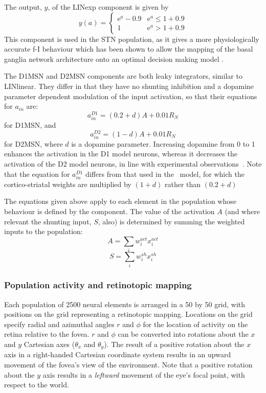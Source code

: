 \documentclass{frontiersSCNS}
\begin{document}
The output, $y$, of the LINexp component is given by
\[
   y(a) = \begin{cases}
      \mathrm{e}^{a}-0.9   & \mathrm{e}^a \leq 1+0.9 \\
      1   & \mathrm{e}^a > 1+0.9
   \end{cases}
\]
This component is used in the STN population, as it gives a more
physiologically accurate f-I
behaviour 
which has been shown to allow the mapping of the basal ganglia network
architecture onto an optimal decision making
model .

The D1MSN and D2MSN components are both leaky integrators, similar to
LINlinear. They differ in that they have no shunting inhibition and a
dopamine parameter dependent modulation of the input activation, so
that their equations for $a_{in}$ are:
\[
   a_{in}^{D1} = (0.2 + d)A + 0.01 R_N
\]
for D1MSN, and
\[
   a_{in}^{D2} = (1 - d)A + 0.01 R_N
\]
for D2MSN, where $d$ is a dopamine parameter. Increasing dopamine from
0 to 1 enhances the activation in the D1 model neurons, whereas it
decreases the activation of the D2 model neurons, in line with
experimental observations~\cite{refs}. Note that the equation for
$a_{in}^{D1}$ differs from that used in the \ccg~model, for which the
cortico-striatal weights are multiplied by $(1+d)$ rather than $(0.2+d)$

The equations given above apply to each element in the population
whose behaviour is defined by the component. The value of the
activation $A$ (and where relevant the shunting input, $S$, also) is
determined by summing the weighted inputs to the population:
\[
A = \sum_{i}w_i^{act} x_i^{act}
\]
\[
S = \sum_{i}w_i^{sh} x_i^{sh}
\]

%
%

\subsubsection{Population activity and retinotopic mapping}

Each population of 2500 neural elements is arranged in a 50 by 50
grid, with positions on the grid representing a retinotopic
mapping. Locations on the grid specify radial and azimuthal angles $r$
and $\phi$ for the location of activity on the retina relative to the
fovea. $r$ and $\phi$ can be converted into rotations about the $x$ and
$y$ Cartesian axes ($\theta_x$ and $\theta_y$). The result of a
positive rotation about the $x$ axis in a right-handed Cartesian
coordinate system results in an upward movement of the fovea's view
of the environment. Note that a positive rotation about the $y$ axis
results in a \emph{leftward} movement of the eye's focal point, with
respect to the world.
\end{document}
